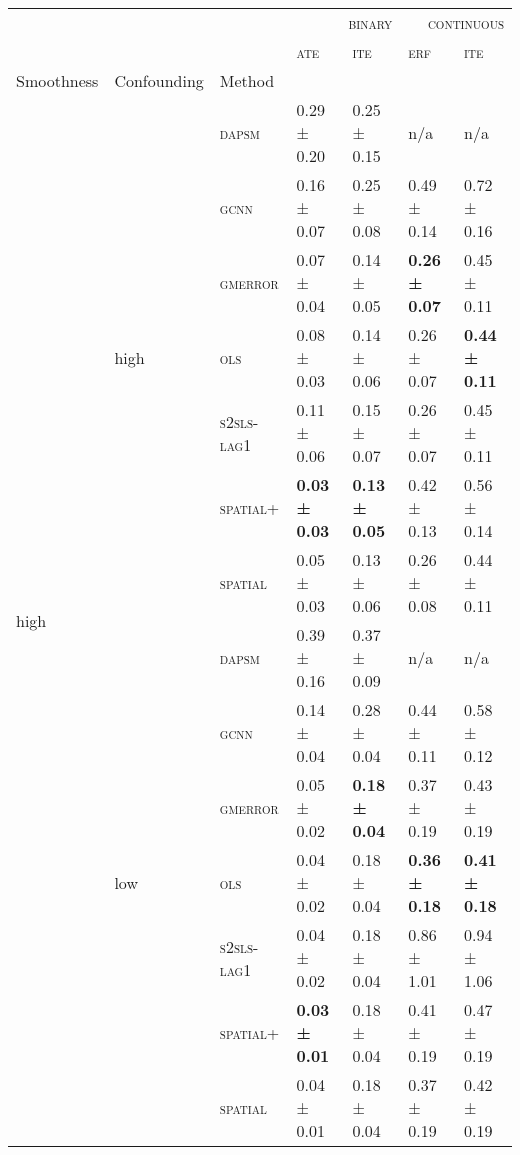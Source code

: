 \documentclass{article}
\begin{document}
\scriptsize
\begin{table}[!tbp]
\centering
\begin{tabular}{lllllll}
\toprule
 &  &  & \multicolumn{2}{r}{\textsc{binary}} & \multicolumn{2}{r}{\textsc{continuous}} \\
 &  &  & \textsc{ate} & \textsc{ite} & \textsc{erf} & \textsc{ite} \\
Smoothness & Confounding & Method &  &  &  &  \\
\midrule
\multirow[t]{14}{*}{high} & \multirow[t]{7}{*}{high} & \textsc{dapsm} & 0.29 ± {\small 0.20} & 0.25 ± {\small 0.15} & n/a & n/a \\
 &  & \textsc{gcnn} & 0.16 ± {\small 0.07} & 0.25 ± {\small 0.08} & 0.49 ± {\small 0.14} & 0.72 ± {\small 0.16} \\
 &  & \textsc{gmerror} & 0.07 ± {\small 0.04} & 0.14 ± {\small 0.05} & \bf 0.26 ± {\small 0.07} & 0.45 ± {\small 0.11} \\
 &  & \textsc{ols} & 0.08 ± {\small 0.03} & 0.14 ± {\small 0.06} & 0.26 ± {\small 0.07} & \bf 0.44 ± {\small 0.11} \\
 &  & \textsc{s2sls-lag1} & 0.11 ± {\small 0.06} & 0.15 ± {\small 0.07} & 0.26 ± {\small 0.07} & 0.45 ± {\small 0.11} \\
 &  & \textsc{spatial+} & \bf 0.03 ± {\small 0.03} & \bf 0.13 ± {\small 0.05} & 0.42 ± {\small 0.13} & 0.56 ± {\small 0.14} \\
 &  & \textsc{spatial} & 0.05 ± {\small 0.03} & 0.13 ± {\small 0.06} & 0.26 ± {\small 0.08} & 0.44 ± {\small 0.11} \\
\cline{2-7}
 & \multirow[t]{7}{*}{low} & \textsc{dapsm} & 0.39 ± {\small 0.16} & 0.37 ± {\small 0.09} & n/a & n/a \\
 &  & \textsc{gcnn} & 0.14 ± {\small 0.04} & 0.28 ± {\small 0.04} & 0.44 ± {\small 0.11} & 0.58 ± {\small 0.12} \\
 &  & \textsc{gmerror} & 0.05 ± {\small 0.02} & \bf 0.18 ± {\small 0.04} & 0.37 ± {\small 0.19} & 0.43 ± {\small 0.19} \\
 &  & \textsc{ols} & 0.04 ± {\small 0.02} & 0.18 ± {\small 0.04} & \bf 0.36 ± {\small 0.18} & \bf 0.41 ± {\small 0.18} \\
 &  & \textsc{s2sls-lag1} & 0.04 ± {\small 0.02} & 0.18 ± {\small 0.04} & 0.86 ± {\small 1.01} & 0.94 ± {\small 1.06} \\
 &  & \textsc{spatial+} & \bf 0.03 ± {\small 0.01} & 0.18 ± {\small 0.04} & 0.41 ± {\small 0.19} & 0.47 ± {\small 0.19} \\
 &  & \textsc{spatial} & 0.04 ± {\small 0.01} & 0.18 ± {\small 0.04} & 0.37 ± {\small 0.19} & 0.42 ± {\small 0.19} \\

\end{tabular}
\end{table}
\end{document}
